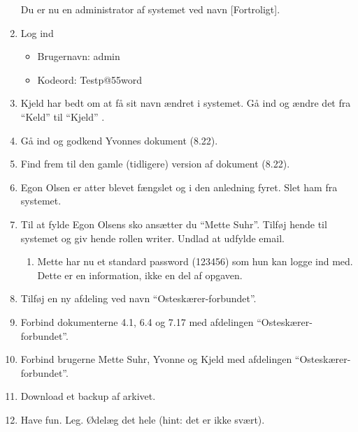 \begin{enumerate}
Du er nu en administrator af systemet ved navn [Fortroligt].
	\item Log ind
		\begin{itemize}
			\item Brugernavn: admin
			\item Kodeord: Testp@55word
		\end{itemize}
	\item Kjeld har bedt om at få sit navn ændret i systemet. Gå ind og ændre det fra “Keld” til “Kjeld” .
	\item Gå ind og godkend Yvonnes dokument (8.22).
	\item Find frem til den gamle (tidligere) version af dokument (8.22).
	\item Egon Olsen er atter blevet fængslet og i den anledning fyret. Slet ham fra systemet.
	\item Til at fylde Egon Olsens sko ansætter du “Mette Suhr”. 	Tilføj hende til systemet og giv hende rollen writer.
Undlad at udfylde email.
		\begin{enumerate}
			\item Mette har nu et standard password (123456) som hun kan logge ind med. Dette er en information, ikke en del af opgaven.
		\end{enumerate}
	\item Tilføj en ny afdeling ved navn “Osteskærer-forbundet”.
	\item Forbind dokumenterne 4.1, 6.4 og 7.17 med afdelingen “Osteskærer-forbundet”.
	\item Forbind brugerne Mette Suhr, Yvonne og Kjeld med afdelingen “Osteskærer-forbundet”.
	\item Download et backup af arkivet.
	\item Have fun. Leg. Ødelæg det hele (hint: det er ikke svært).
\end{enumerate}
